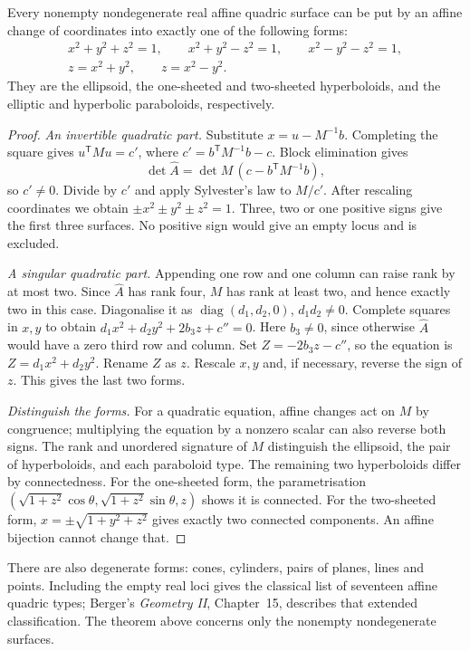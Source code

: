 \begin{theorem}\label{geometry:thm:quadrics}
Every nonempty nondegenerate real affine quadric surface can be put by an
affine change of coordinates into exactly one of the following forms:
\[
\begin{gathered}
 x^2+y^2+z^2=1,\qquad x^2+y^2-z^2=1,\qquad x^2-y^2-z^2=1,\\
 z=x^2+y^2,\qquad z=x^2-y^2.
\end{gathered}
\]
They are the ellipsoid, the one-sheeted and two-sheeted hyperboloids,
and the elliptic and hyperbolic paraboloids, respectively.
\end{theorem}
\begin{proof}
\emph{An invertible quadratic part.}
Substitute $x=u-M^{-1}b$. Completing the square gives
$u^{\mathsf T}Mu=c'$, where $c'=b^{\mathsf T}M^{-1}b-c$.
Block elimination gives
\[
 \det\widehat A=\det M\,(c-b^{\mathsf T}M^{-1}b),
\]
so $c'\ne0$. Divide by $c'$ and apply Sylvester's law to $M/c'$.
After rescaling coordinates we obtain $\pm x^2\pm y^2\pm z^2=1$.
Three, two or one positive signs give the first three surfaces.
No positive sign would give an empty locus and is excluded.

\emph{A singular quadratic part.}
Appending one row and one column can raise rank by at most two.
Since $\widehat A$ has rank four, $M$ has rank at least two, and hence
exactly two in this case. Diagonalise it as
$\operatorname{diag}(d_1,d_2,0)$, $d_1d_2\ne0$.
Complete squares in $x,y$ to obtain
$d_1x^2+d_2y^2+2b_3z+c''=0$.
Here $b_3\ne0$, since otherwise $\widehat A$ would have a zero third
row and column. Set $Z=-2b_3z-c''$, so the equation is $Z=d_1x^2+d_2y^2$.
Rename $Z$ as $z$. Rescale $x,y$ and, if necessary, reverse the sign
of $z$. This gives the last two forms.

\emph{Distinguish the forms.}
For a quadratic equation, affine changes act on $M$ by congruence;
multiplying the equation by a nonzero scalar can also reverse both signs.
The rank and unordered signature of $M$ distinguish the ellipsoid,
the pair of hyperboloids, and each paraboloid type.
The remaining two hyperboloids differ by connectedness.
For the one-sheeted form, the parametrisation
$(\sqrt{1+z^2}\cos\theta,\sqrt{1+z^2}\sin\theta,z)$ shows it is
connected. For the two-sheeted form, $x=\pm\sqrt{1+y^2+z^2}$ gives
exactly two connected components. An affine bijection cannot change that.
\end{proof}

\begin{remark}
There are also degenerate forms: cones, cylinders, pairs of planes, lines
and points. Including the empty real loci gives the classical list of
seventeen affine quadric types; Berger's \emph{Geometry II}, Chapter~15,
describes that extended classification. The theorem above concerns only
the nonempty nondegenerate surfaces.
\end{remark}

